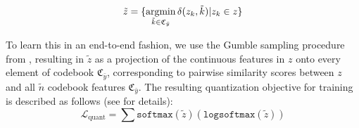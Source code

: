 
\vspace*{-0.2cm}
\begin{equation}
    \tilde{z} = \{\operatorname*{argmin}_{\tilde{k} \in \mathfrak{C}_{\bar{y}}} \delta (z_k, \tilde{k})| z_k \in z \} 
    \label{eqn:codebooks}
\end{equation}

To learn  %
this in an end-to-end fashion, we use the Gumble sampling procedure from \cite{jang2016categorical},  resulting in $\tilde{z}$ as a projection of the continuous features in $z$ onto every element of codebook 
$\mathfrak{C}_{\bar{y}}$, corresponding to pairwise similarity scores between $z$ and all $\tilde{n}$ codebook features $\mathfrak{C}_{\bar{y}}$.
The resulting quantization objective for training is described as follows (see \cite{jang2016categorical} for details):
\begin{equation}
    \mathcal{L}_{\textrm{quant}} = \sum \texttt{softmax}(\tilde{z}) \left(\texttt{logsoftmax}(\tilde{z})\right)
    \label{eqn:quantizationloss}
\end{equation}



